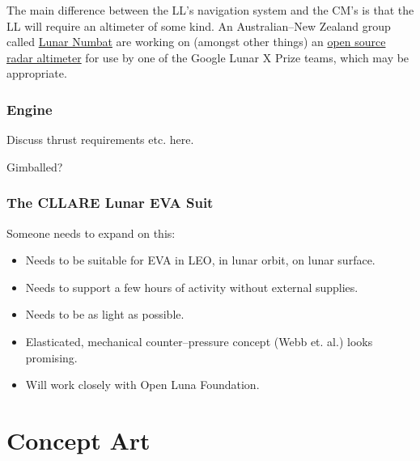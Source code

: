 \documentclass{report}
\begin{document}
The main difference between the LL's navigation system and the CM's is that the LL will require an altimeter of some kind.  An Australian--New Zealand group called \href{http://www.lunarnumbat.org}{Lunar Numbat} are working on (amongst other things) an \href{http://www.lunarnumbat.org/cgi-bin/twiki/view/LunarNumbat/LNTaskRadarAltimeter}{open source radar altimeter} for use by one of the Google Lunar X Prize teams, which may be appropriate.

\subsection{Engine}

Discuss thrust requirements etc. here.

Gimballed?

\subsection{The CLLARE Lunar EVA Suit}

Someone needs to expand on this:
\begin{itemize}
\item Needs to be suitable for EVA in LEO, in lunar orbit, on lunar surface.
\item Needs to support a few hours of activity without external supplies.
\item Needs to be as light as possible.
\item Elasticated, mechanical counter--pressure concept (Webb et. al.) looks promising.
\item Will work closely with Open Luna Foundation.
\end{itemize}

\chapter{Concept Art}
\end{document}
